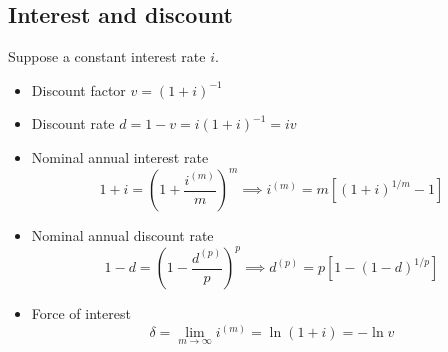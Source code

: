 \subsection{Interest and discount}

Suppose a constant interest rate $i$.

\begin{itemize}
\item Discount factor $v = (1 + i)^{-1}$
\item Discount rate $d = 1 - v = i(1 + i)^{-1} = iv$
\item Nominal annual interest rate
\begin{equation*}
1 + i = \left(1 + \frac{i^{(m)}}{m}\right)^m\implies i^{(m)} = m[(1 + i)^{1/m} - 1]
\end{equation*}
\item Nominal annual discount rate
\begin{equation*}
1 - d = \left(1 - \frac{d^{(p)}}{p}\right)^p\implies d^{(p)} = p[1 - (1 - d)^{1/p}]
\end{equation*}
\item Force of interest
\begin{equation*}
\delta = \lim_{m\to\infty} i^{(m)} = \ln(1 + i) = -\ln v
\end{equation*}
\end{itemize}